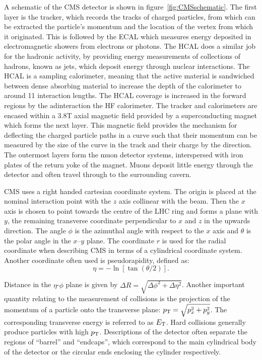 A schematic of the CMS detector is shown in figure~\ref{fig:CMSschematic}. 
The first layer is the tracker, which records the tracks of charged particles,
from which can be extracted the particle's momentum and the location of the
vertex from which it originated. This is followed by the \ac{ECAL} which measures
energy deposited in electromagnetic showers from electrons or photons. The
\ac{HCAL} does a similar job for the hadronic activity, by providing energy
measurements of collections of hadrons, known as jets, which deposit energy
through nuclear interactions. The \ac{HCAL} is a sampling calorimeter, meaning
that the active material is sandwiched between dense absorbing material to
increase the depth of the calorimeter to around 11 interaction lengths. The
\ac{HCAL} coverage is increased in the forward regions by the adinteraction 
the \ac{HF} calorimeter. The tracker and calorimeters are encased within a 3.8T axial magnetic
field provided by a superconducting magnet which forms the next layer. This
magnetic field provides the mechanism for deflecting the charged particle paths in
a curve such that their momentum can be measured by the size of the curve in the
track and their charge by the direction. The
outermost layers form the muon detector systems, interspersed with iron plates
of the return yoke of the magnet. Muons deposit little energy
through the detector and often travel through to the surrounding cavern. 

CMS uses a right handed cartesian coordinate system. The
origin is placed at the nominal interaction point with the $z$ axis collinear with the
beam. Then the $x$ axis is chosen to point towards the centre of the LHC ring
and forms a plane with $y$, the remaining transverse coordinate perpendicular to
$x$ and $z$ in the upwards direction. The angle $\phi$ is the azimuthal angle with respect to the $x$
axis and $\theta$ is the polar angle in the $x$--$y$ plane. The coordinate $r$
is used for the radial coordinate when describing CMS in terms of a cylindrical
coordinate system. Another coordinate often used is pseudorapidity, defined as:
\begin{equation}
\eta = - \ln[\tan(\theta/2)]. 
\end{equation}

Distance in the $\eta$-$\phi$ plane is given by $\Delta R =
\sqrt{\Delta\phi^{2} + \Delta\eta^{2}}$.
Another important quantity relating to the measurement of collisions is the
projection of the momentum of a particle onto the transverse plane: $p_{\mathrm{T}} =
\sqrt{p_{x}^{2} + p_{y}^{2}}$. The corresponding transverse energy is referred
to as $E_{\text T}$. Hard collisions generally produce particles with
high $p_{\mathrm{T}}$. Descriptions of the detector often separate the regions of
``barrel'' and ``endcaps'', which correspond to the main cylindrical body of
the detector or the circular ends enclosing the cylinder respectively. 

